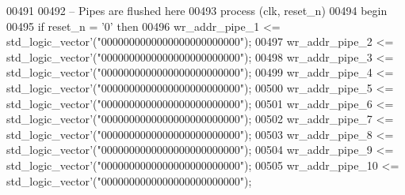 \begin{DoxyCode}
00491 
00492 \textcolor{keyword}{  -- Pipes are flushed here}
00493   \textcolor{keywordflow}{process} (clk, reset_n)
00494 \textcolor{vhdlkeyword}{  begin}
00495     \textcolor{keywordflow}{if} \textcolor{vhdlchar}{reset_n} \textcolor{vhdlchar}{=} \textcolor{vhdlchar}{'}\textcolor{vhdllogic}{}\textcolor{vhdllogic}{0}\textcolor{vhdlchar}{'} \textcolor{keywordflow}{then}
00496       \textcolor{vhdlchar}{wr_addr_pipe_1} \textcolor{vhdlchar}{<=} \textcolor{comment}{std\_logic\_vector}\textcolor{vhdlchar}{'}\textcolor{vhdlchar}{(}\textcolor{vhdllogic}{"0000000000000000000000000"}\textcolor{vhdlchar}{)};
00497       \textcolor{vhdlchar}{wr_addr_pipe_2} \textcolor{vhdlchar}{<=} \textcolor{comment}{std\_logic\_vector}\textcolor{vhdlchar}{'}\textcolor{vhdlchar}{(}\textcolor{vhdllogic}{"0000000000000000000000000"}\textcolor{vhdlchar}{)};
00498       \textcolor{vhdlchar}{wr_addr_pipe_3} \textcolor{vhdlchar}{<=} \textcolor{comment}{std\_logic\_vector}\textcolor{vhdlchar}{'}\textcolor{vhdlchar}{(}\textcolor{vhdllogic}{"0000000000000000000000000"}\textcolor{vhdlchar}{)};
00499       \textcolor{vhdlchar}{wr_addr_pipe_4} \textcolor{vhdlchar}{<=} \textcolor{comment}{std\_logic\_vector}\textcolor{vhdlchar}{'}\textcolor{vhdlchar}{(}\textcolor{vhdllogic}{"0000000000000000000000000"}\textcolor{vhdlchar}{)};
00500       \textcolor{vhdlchar}{wr_addr_pipe_5} \textcolor{vhdlchar}{<=} \textcolor{comment}{std\_logic\_vector}\textcolor{vhdlchar}{'}\textcolor{vhdlchar}{(}\textcolor{vhdllogic}{"0000000000000000000000000"}\textcolor{vhdlchar}{)};
00501       \textcolor{vhdlchar}{wr_addr_pipe_6} \textcolor{vhdlchar}{<=} \textcolor{comment}{std\_logic\_vector}\textcolor{vhdlchar}{'}\textcolor{vhdlchar}{(}\textcolor{vhdllogic}{"0000000000000000000000000"}\textcolor{vhdlchar}{)};
00502       \textcolor{vhdlchar}{wr_addr_pipe_7} \textcolor{vhdlchar}{<=} \textcolor{comment}{std\_logic\_vector}\textcolor{vhdlchar}{'}\textcolor{vhdlchar}{(}\textcolor{vhdllogic}{"0000000000000000000000000"}\textcolor{vhdlchar}{)};
00503       \textcolor{vhdlchar}{wr_addr_pipe_8} \textcolor{vhdlchar}{<=} \textcolor{comment}{std\_logic\_vector}\textcolor{vhdlchar}{'}\textcolor{vhdlchar}{(}\textcolor{vhdllogic}{"0000000000000000000000000"}\textcolor{vhdlchar}{)};
00504       \textcolor{vhdlchar}{wr_addr_pipe_9} \textcolor{vhdlchar}{<=} \textcolor{comment}{std\_logic\_vector}\textcolor{vhdlchar}{'}\textcolor{vhdlchar}{(}\textcolor{vhdllogic}{"0000000000000000000000000"}\textcolor{vhdlchar}{)};
00505       \textcolor{vhdlchar}{wr_addr_pipe_10} \textcolor{vhdlchar}{<=} \textcolor{comment}{std\_logic\_vector}\textcolor{vhdlchar}{'}\textcolor{vhdlchar}{(}\textcolor{vhdllogic}{"0000000000000000000000000"}\textcolor{vhdlchar}{)};

\end{DoxyCode}
